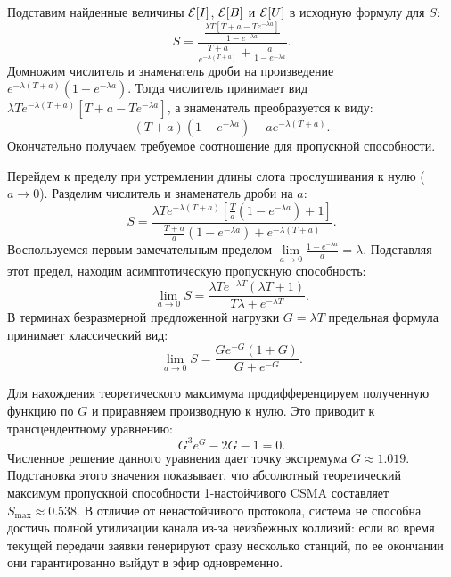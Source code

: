 \begin{sproof}
    Подставим найденные величины $\mathcal{E}[I]$, $\mathcal{E}[B]$ и $\mathcal{E}[U]$ в исходную формулу для $S$:
    $$ S = \frac{\frac{\lambda T \left[ T + a - T e^{-\lambda a} \right]}{1 - e^{-\lambda a}}}{\frac{T+a}{e^{-\lambda(T+a)}} + \frac{a}{1 - e^{-\lambda a}}}. $$
    Домножим числитель и знаменатель дроби на произведение $e^{-\lambda(T+a)} (1 - e^{-\lambda a})$. Тогда числитель принимает вид $\lambda T e^{-\lambda(T+a)} [T + a - T e^{-\lambda a}]$, а знаменатель преобразуется к виду:
    $$ (T+a)(1 - e^{-\lambda a}) + a e^{-\lambda(T+a)}. $$
    Окончательно получаем требуемое соотношение для пропускной способности.
\end{sproof}

\begin{conseq}
    Перейдем к пределу при устремлении длины слота прослушивания к нулю ($a \to 0$). Разделим числитель и знаменатель дроби на $a$:
    $$ S = \frac{\lambda T e^{-\lambda(T+a)} \left[ \frac{T}{a}(1 - e^{-\lambda a}) + 1 \right]}{\frac{T+a}{a}(1 - e^{-\lambda a}) + e^{-\lambda(T+a)}}. $$
    Воспользуемся первым замечательным пределом $\lim\limits_{a \to 0} \frac{1 - e^{-\lambda a}}{a} = \lambda$. Подставляя этот предел, находим асимптотическую пропускную способность:
    $$ \lim_{a \to 0} S = \frac{\lambda T e^{-\lambda T} (\lambda T + 1)}{T \lambda + e^{-\lambda T}}. $$
    В терминах безразмерной предложенной нагрузки $G = \lambda T$ предельная формула принимает классический вид:
    $$ \lim_{a \to 0} S = \frac{G e^{-G} (1 + G)}{G + e^{-G}}. $$
    
    Для нахождения теоретического максимума продифференцируем полученную функцию по $G$ и приравняем производную к нулю. Это приводит к трансцендентному уравнению:
    $$ G^3 e^G - 2G - 1 = 0. $$
    Численное решение данного уравнения дает точку экстремума $G \approx 1.019$. Подстановка этого значения показывает, что абсолютный теоретический максимум пропускной способности 1-настойчивого CSMA составляет $S_{\max} \approx 0.538$. В отличие от ненастойчивого протокола, система не способна достичь полной утилизации канала из-за неизбежных коллизий: если во время текущей передачи заявки генерируют сразу несколько станций, по ее окончании они гарантированно выйдут в эфир одновременно.
\end{conseq}

